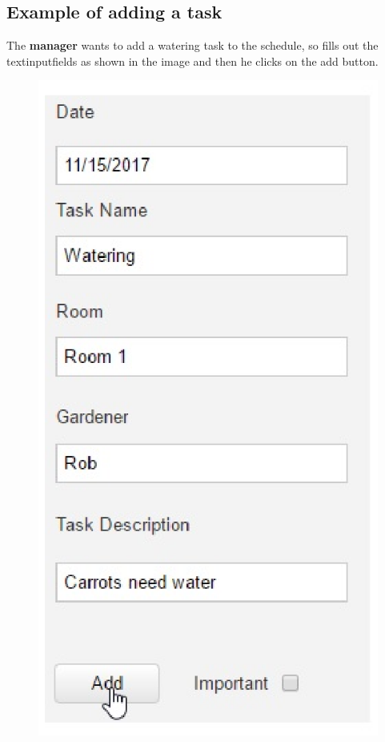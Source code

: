 \subsection{Example of adding a task}
The \textbf{manager} wants to add a watering task to the schedule, so fills out
the textinputfields as shown in the image and then he clicks on the add button.
 \begin{figure}
\includegraphics[width=1\textwidth]{images/addingTaskGardener.eps}
 \end{figure}


